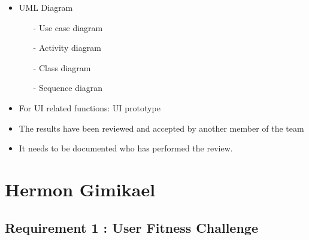 \documentclass{article}
\begin{document}
\begin{itemize}
\item
  UML Diagram
  \begin{itemize}
	\item[-] Use case diagram
	\item[-] Activity diagram
	\item[-] Class diagram
	\item[-] Sequence diagran
   \end{itemize}
\end{itemize}

\begin{itemize}
\item
  For UI related functions: UI prototype
\item
  The results have been reviewed and accepted by another member of the
  team
\end{itemize}

\begin{itemize}
\item
  It needs to be documented who has performed the review.
\end{itemize}
\newpage

\section{Hermon Gimikael}
\subsection{Requirement 1 : User Fitness Challenge}
\end{document}
